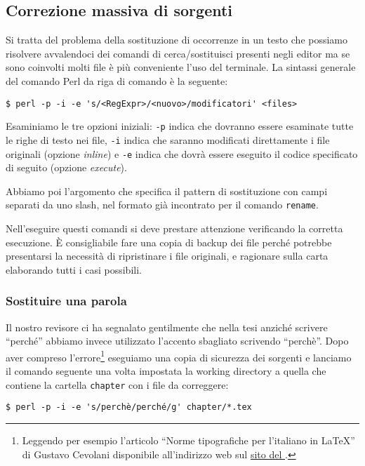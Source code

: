 \subsection{Correzione massiva di sorgenti}

Si tratta del problema della sostituzione di occorrenze in un testo che possiamo
risolvere avvalendoci dei comandi di cerca/sostituisci presenti negli editor ma
se sono coinvolti molti file è più conveniente l'uso del terminale. La sintassi
generale del comando Perl da riga di comando è la seguente:
\begin{verbatim}
$ perl -p -i -e 's/<RegExpr>/<nuovo>/modificatori' <files>
\end{verbatim}

Esaminiamo le tre opzioni iniziali: \texttt{-p} indica che dovranno essere
esaminate tutte le righe di testo nei file, \texttt{-i} indica che saranno
modificati direttamente i file originali (opzione \emph{inline}) e \texttt{-e}
indica che dovrà essere eseguito il codice specificato di seguito (opzione
\emph{execute}).

Abbiamo poi l'argomento che specifica il pattern di sostituzione con campi
separati da uno slash, nel formato già incontrato per il comando
\texttt{rename}.

Nell'eseguire questi comandi si deve prestare attenzione verificando la corretta
esecuzione. \`E consigliabile fare una copia di backup dei file perché potrebbe
presentarsi la necessità di ripristinare i file originali, e ragionare sulla
carta elaborando tutti i casi possibili.


\subsubsection{Sostituire una parola}

Il nostro revisore ci ha segnalato gentilmente che nella tesi anziché scrivere
``perché'' abbiamo invece utilizzato l'accento sbagliato scrivendo ``perchè''.
Dopo aver compreso l'errore\footnote{Leggendo per esempio l'articolo ``Norme
tipografiche per l’italiano in \LaTeX'' di Gustavo Cevolani disponibile
all'indirizzo web sul
\href{http://www.guitex.org/home/images/ArsTeXnica/AT001/norme\%20tipografiche\%20per\%20litaliano\%20in\%20latex.pdf}{sito
del \GuIT*}.} eseguiamo una copia di sicurezza dei sorgenti e lanciamo il
comando seguente una volta impostata la working directory a quella che contiene
la cartella \texttt{chapter} con i file da correggere:
\begin{verbatim}
$ perl -p -i -e 's/perchè/perché/g' chapter/*.tex
\end{verbatim}

